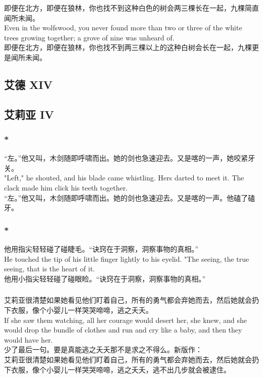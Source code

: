\documentclass[12pt,a4paper]{article}
\newcommand{\h}[1]{{\color{red}#1}\\}
\newcommand{\la}[1]{{\color{blue}#1}\\}
\begin{document}
\subsubsection{}\la{
	即便在北方，即便在狼林，你也找不到这种白色的树会两三棵长在一起，九棵简直闻所未闻。\\
	Even in the wolfswood, you never found more than two or three of the white trees growing together; a grove of nine was unheard of.}
	即便在北方，即便在狼林，你也找不到两三棵以上的这种白树会长在一起，九棵更是闻所未闻。
		
\subsection{艾德 XIV}

\subsection{艾莉亚 IV}
\subsubsection{\color{red}*}\la{
	“左。”他又叫，木剑随即呼啸而出。她的剑也急速迎去。又是喀的一声，她咬紧牙关。\\
	"Left," he shouted, and his blade came whistling. Hers darted to meet it. The clack made him click his teeth together.}
	“左。”他又叫，木剑随即呼啸而出。她的剑也急速迎去。又是喀的一声。他磕了磕牙。
	
\subsubsection{\color{red}*}\la{
	他用指尖轻轻碰了碰睫毛。“诀窍在于洞察，洞察事物的真相。”\\
	He touched the tip of his little finger lightly to his eyelid. "The seeing, the true seeing, that is the heart of it.}
	他用小指尖轻轻碰了碰眼睑。“诀窍在于洞察，洞察事物的真相。”
	
\subsubsection{}\la{
	艾莉亚很清楚如果她看见他们盯着自己，所有的勇气都会弃她而去，然后她就会扔下衣服，像个小婴儿一样哭哭啼啼，逃之夭夭。\\
	If she saw them watching, all her courage would desert her, she knew, and she would drop the bundle of clothes and run and cry like a baby, and then they would have her.}\h{
	少了最后一句。要是真能逃之夭夭那不是求之不得么。新版作：}
	艾莉亚很清楚如果她看见他们盯着自己，所有的勇气都会弃她而去，然后她就会扔下衣服，像个小婴儿一样哭哭啼啼，逃之夭夭，逃不出几步就会被逮住。
\end{document}
